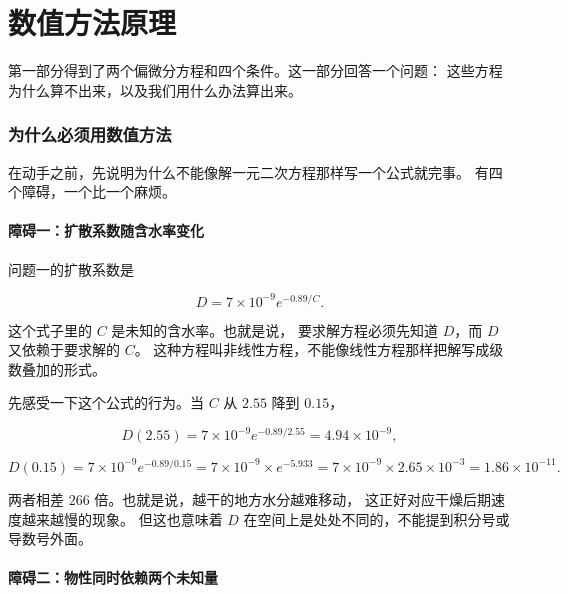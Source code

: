 \part{数值方法原理}

第一部分得到了两个偏微分方程和四个条件。这一部分回答一个问题：
这些方程为什么算不出来，以及我们用什么办法算出来。

\section{为什么必须用数值方法}

在动手之前，先说明为什么不能像解一元二次方程那样写一个公式就完事。
有四个障碍，一个比一个麻烦。

\subsection{障碍一：扩散系数随含水率变化}

问题一的扩散系数是

\begin{equation}
D = 7\times10^{-9}e^{-0.89/C}.
\end{equation}

这个式子里的 $C$ 是未知的含水率。也就是说，
要求解方程必须先知道 $D$，而 $D$ 又依赖于要求解的 $C$。
这种方程叫非线性方程，不能像线性方程那样把解写成级数叠加的形式。

先感受一下这个公式的行为。当 $C$ 从 $2.55$ 降到 $0.15$，

\begin{equation}
D(2.55) = 7\times10^{-9}e^{-0.89/2.55}=4.94\times10^{-9},
\end{equation}

\begin{equation}
D(0.15) = 7\times10^{-9}e^{-0.89/0.15}=7\times10^{-9}\times e^{-5.933}
= 7\times10^{-9}\times2.65\times10^{-3}=1.86\times10^{-11}.
\end{equation}

两者相差 $266$ 倍。也就是说，越干的地方水分越难移动，
这正好对应干燥后期速度越来越慢的现象。
但这也意味着 $D$ 在空间上是处处不同的，不能提到积分号或导数号外面。

\subsection{障碍二：物性同时依赖两个未知量}

